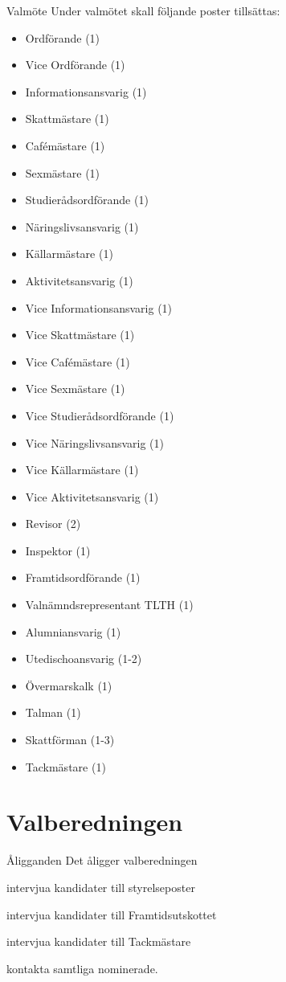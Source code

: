 \documentclass[pdfbookmarks,a4paper,11pt]{article}
\newlength{\itemcollength}
\newenvironment{reglemlista}{%
  \begin{list}{}{%
      \setlength{\labelwidth}{\itemcollength}%
      \setlength{\leftmargin}{\labelwidth + \labelsep}%
      \renewcommand{\makelabel}[1]{%
        \raisebox{0pt}[1ex][0pt]{%
          \makebox[\labelwidth][l]{%
            \parbox[t]{\itemcollength}{%
              \raggedright\hspace{0pt}##1}}}\hfill}%
      }}{%
  \end{list}}
\begin{document}
\begin{reglemlista}
	\item[Valmöte]
	Under valmötet skall följande poster tillsättas:
	\begin{itemize}
		\item Ordförande (1)
		\item Vice Ordförande (1)
		\item Informationsansvarig (1)
		\item Skattmästare (1)
		\item Cafémästare (1)
		\item Sexmästare (1)
		\item Studierådsordförande (1)
		\item Näringslivsansvarig (1)
		\item Källarmästare (1)
		\item Aktivitetsansvarig (1)
		\item Vice Informationsansvarig (1)
		\item Vice Skattmästare (1)
		\item Vice Cafémästare (1)
		\item Vice Sexmästare (1)
		\item Vice Studierådsordförande (1)
		\item Vice Näringslivsansvarig (1)
		\item Vice Källarmästare (1)
		\item Vice Aktivitetsansvarig (1)
		\item Revisor (2)
		\item Inspektor (1)
		\item Framtidsordförande (1)
		\item Valnämndsrepresentant TLTH (1)
		\item Alumniansvarig (1)
		\item Utedischoansvarig (1-2)
		\item Övermarskalk (1)
		\item Talman (1)
		\item Skattförman (1-3)
		\item Tackmästare (1)
	\end{itemize}

\end{reglemlista}

\section{Valberedningen}

\begin{reglemlista}

	\item[Åligganden]
	Det åligger valberedningen
	\begin{attlista}
		\item intervjua kandidater till styrelseposter
		\item intervjua kandidater till Framtidsutskottet
		\item intervjua kandidater till Tackmästare
		\item kontakta samtliga nominerade.
	\end{attlista}

\end{reglemlista}
\end{document}
